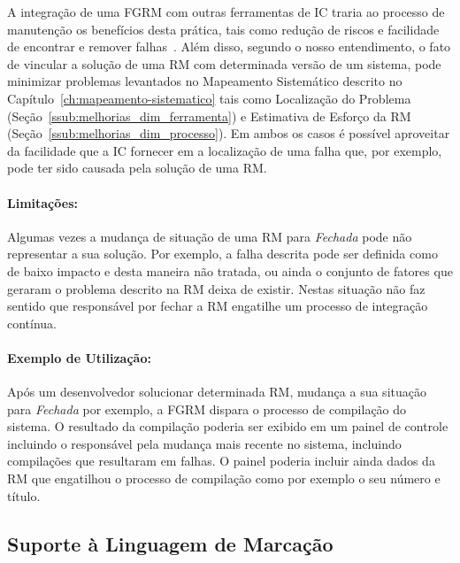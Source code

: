A integração de uma FGRM com outras ferramentas de IC traria ao processo de
manutenção os benefícios desta prática, tais como redução de riscos e facilidade
de encontrar e remover falhas~\cite{fowler2006continuous}.  Além disso, segundo
o nosso entendimento, o fato de vincular a solução de uma RM com determinada
versão de um sistema, pode minimizar problemas levantados no Mapeamento
Sistemático descrito no Capítulo~\ref{ch:mapeamento-sistematico} tais como
Localização do Problema (Seção~\ref{ssub:melhorias_dim_ferramenta}) e Estimativa
de Esforço da RM (Seção~\ref{ssub:melhorias_dim_processo}). Em ambos os casos é
possível aproveitar da facilidade que a IC fornecer em a localização de uma
falha que, por exemplo, pode ter sido causada pela solução de uma RM\@.

\paragraph{Limitações:}
\label{par:limitacoes_s05}

Algumas vezes a mudança de situação de uma RM para \textit{Fechada} pode não
representar a sua solução. Por exemplo, a falha descrita pode ser definida como
de baixo impacto e desta maneira não tratada, ou ainda o conjunto de fatores que
geraram o problema descrito na RM deixa de existir. Nestas situação não faz
sentido que responsável por fechar a RM engatilhe um processo de integração
contínua.

\paragraph{Exemplo de Utilização:}
\label{par:exemplo_de_utilização_s05}

Após um desenvolvedor solucionar determinada RM, mudança a sua situação para
\textit{Fechada} por exemplo, a FGRM dispara o processo de compilação do
sistema. O resultado da compilação poderia ser exibido em um painel de controle
incluindo o responsável pela mudança mais recente no sistema, incluindo
compilações que resultaram em falhas. O painel poderia incluir ainda dados da RM
que engatilhou o processo de compilação como por exemplo o seu número e título.

\subsection{Suporte à Linguagem de Marcação}
\label{sub:suporte_linguagem_marcacao}


